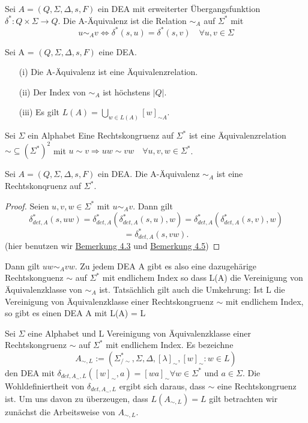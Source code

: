   Sei \(A = (Q, \Sigma, \Delta, s, F)\) ein DEA mit erweiterter Übergangsfunktion \(\delta^{*}: Q \times \Sigma \rightarrow Q\). Die A-Äquivalenz ist die Relation \(\sim_A\) auf \(\Sigma^{*}\) mit 
\[
  u \sim_A v \Leftrightarrow \delta^*(s, u) = \delta^*(s,v) \quad \forall u, v \in \Sigma
\]

Sei A = \((Q, \Sigma, \Delta, s, F)\) eine DEA.
\begin{itemize}
  \item [(i)] Die A-Äquivalenz ist eine Äquivalenzrelation.
  \item [(ii)] Der Index von \(\sim_{A}\) ist höchstens \(|Q|\).
  \item [(iii)] Es gilt \(L(A) = \bigcup \limits_{w \in L(A)} [w]_{\sim A}\).
\end{itemize}

  Sei \(\Sigma\) ein Alphabet Eine Rechtskongruenz auf \(\Sigma^{*}\) ist eine Äquivalenzrelation \(\sim \subseteq (\Sigma^{*})^{2}\) mit \(u \sim v \Rightarrow uw \sim vw \quad \forall u, v, w \in \Sigma^{*}\).

  Sei \(A = (Q, \Sigma, \Delta, s, F)\) ein DEA. Die A-Äquivalenz \(\sim_{A}\) ist eine Rechtskonqruenz auf \(\Sigma^{*}\).
  \begin{proof}
    Seien \(u, v, w \in \Sigma^{*}\) mit \(u \sim_{A} v\). Dann gilt 
    \[
      \delta_{det, A}^{*}(s, uw) = \delta_{det,A}^{*}(\delta_{det,A}^{*}(s, u), w) = \delta_{det,A}^{*}(\delta_{det,A}^{*}(s,v), w)\] \[= \delta_{det,A}^{*}(s, vw).
    \] 
    (hier benutzen wir \hyperref[subsec:4.3]{Bemerkung 4.3} und \hyperref[subsec:4.5]{Bemerkung 4.5})    
  \end{proof} 
  Dann gilt \(uw\sim_{A}vw\). Zu jedem DEA A gibt es also eine dazugehärige Rechtskonguenz \(\sim\) auf \(\Sigma^{*}\) mit endlichem Index so dass L(A) die Vereinigung von Äquivalenzklasse von \(\sim_{A}\) ist. Tatsächlich gilt auch die Umkehrung: Ist L die Vereinigung von Äquivalenzklasse einer Rechtskongruenz \(\sim\) mit endlichem Index, so gibt es einen DEA A mit L(A) = L

  Sei \(\Sigma\) eine Alphabet und L Vereinigung von Äquivalenzklasse einer Rechtskongruenz \(\sim\) auf \(\Sigma^{*}\) mit endlichem Index. Es bezeichne
  \[
    A_{\sim , L} := (\Sigma^{*}_{/\sim}, \Sigma, \Delta, [\lambda]_{\sim}, {[w]_{\sim} : w \in L})
  \]
  den DEA mit \(\delta_{det, A_{\sim}, L}([w]_{\sim}, a) = [wa]_{\sim} \forall w \in \Sigma^{*}\) und \(a \in \Sigma\). Die Wohldefiniertheit von \(\delta_{det, A_{\sim}, L}\) ergibt sich daraus, dass \(\sim\) eine Rechtskongruenz ist. Um uns davon zu überzeugen, dass \(L(A_{\sim, L}) = L\) gilt betrachten wir zunächst die Arbeitsweise von \(A_{\sim, L}\).

